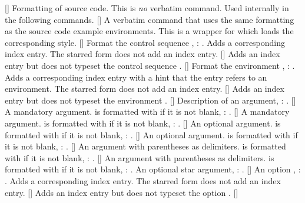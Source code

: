 \documentclass[load-preamble]{cnltx-doc}
\begin{document}
\begin{commands}
  []
    Formatting of source code.  This is \emph{no} verbatim command.  Used
    internally in the following commands.
  []
    A verbatim command that uses the same formatting as the
    source code example environments.  This is a wrapper for 
    which loads the corresponding style.
  [\sarg{}]
    Format the control sequence , :
    .  Adds a corresponding index entry.  The starred form does not
    add an index entry.
  []
    Adds an index entry but does not typeset the control sequence
    .
  [\sarg{}]
    Format the environment , :
    .  Adds a corresponding index entry with a hint that the entry
    refers to an environment.  The starred form does not add an index entry.
  []
    Adds an index entry but does not typeset the environment .
  []
    Description of an argument, : .
  []
    A mandatory argument.  is formatted with  if it is not
    blank, : .
  []
    A mandatory argument.  is formatted with
     if it is not blank, : .
  []
    An optional argument.  is formatted with  if it is not
    blank, : .
  []
    An optional argument.  is formatted with
     if it is not blank, : .
  []
    An argument with parentheses as delimiters.  is formatted with
     if it is not blank, : .
  []
    An argument with parentheses as delimiters. 
    is formatted with  if it is not blank, :
    .
    An optional star argument, : \sarg.
  [\sarg{}]
    An option , : .  Adds a
    corresponding index entry.  The starred form does not add an index entry.
  []
    Adds an index entry but does not typeset the option .
  [\sarg\code{-}]

\end{commands}
\end{document}
